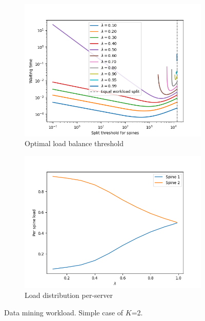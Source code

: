 \\
\begin{figure}
	\centering
	\begin{subfigure}{.5\textwidth}
		\centering
		\includegraphics[width=.99\linewidth]{Chapter3/Figures/equal_workload_split_bpdm}
		\caption{Optimal load balance threshold}
		\label{fig:cost-bm}
	\end{subfigure}%
	\begin{subfigure}{.5\textwidth}
		\centering
		\includegraphics[width=.99\linewidth]{Chapter3/Figures/per_spine_load_bpdm}
		\caption{Load distribution per-server }
		\label{fig:perspineload-bm}
	\end{subfigure}
	\caption{Data mining workload. Simple case of $K$=2.}
	\label{fig:lbthreshold-bm}
\end{figure}
